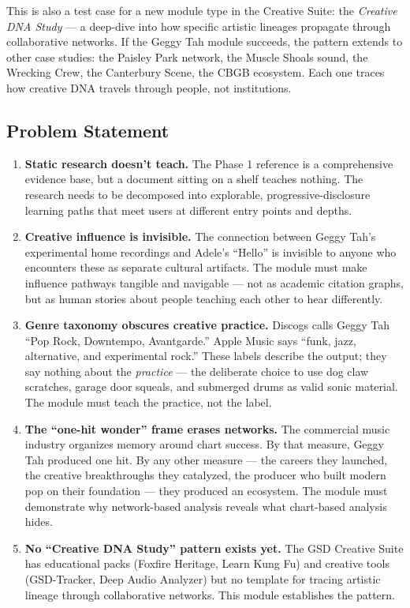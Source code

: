 \documentclass[11pt,letterpaper]{article}
\begin{document}
This is also a test case for a new module type in the Creative Suite: the \textit{Creative DNA Study} --- a deep-dive into how specific artistic lineages propagate through collaborative networks. If the Geggy Tah module succeeds, the pattern extends to other case studies: the Paisley Park network, the Muscle Shoals sound, the Wrecking Crew, the Canterbury Scene, the CBGB ecosystem. Each one traces how creative DNA travels through people, not institutions.

\subsection{Problem Statement}

\begin{enumerate}[leftmargin=2em]
\item \textbf{Static research doesn't teach.} The Phase 1 reference is a comprehensive evidence base, but a document sitting on a shelf teaches nothing. The research needs to be decomposed into explorable, progressive-disclosure learning paths that meet users at different entry points and depths.

\item \textbf{Creative influence is invisible.} The connection between Geggy Tah's experimental home recordings and Adele's ``Hello'' is invisible to anyone who encounters these as separate cultural artifacts. The module must make influence pathways tangible and navigable --- not as academic citation graphs, but as human stories about people teaching each other to hear differently.

\item \textbf{Genre taxonomy obscures creative practice.} Discogs calls Geggy Tah ``Pop Rock, Downtempo, Avantgarde.'' Apple Music says ``funk, jazz, alternative, and experimental rock.'' These labels describe the output; they say nothing about the \textit{practice} --- the deliberate choice to use dog claw scratches, garage door squeals, and submerged drums as valid sonic material. The module must teach the practice, not the label.

\item \textbf{The ``one-hit wonder'' frame erases networks.} The commercial music industry organizes memory around chart success. By that measure, Geggy Tah produced one hit. By any other measure --- the careers they launched, the creative breakthroughs they catalyzed, the producer who built modern pop on their foundation --- they produced an ecosystem. The module must demonstrate why network-based analysis reveals what chart-based analysis hides.

\item \textbf{No ``Creative DNA Study'' pattern exists yet.} The GSD Creative Suite has educational packs (Foxfire Heritage, Learn Kung Fu) and creative tools (GSD-Tracker, Deep Audio Analyzer) but no template for tracing artistic lineage through collaborative networks. This module establishes the pattern.
\end{enumerate}
\end{document}
